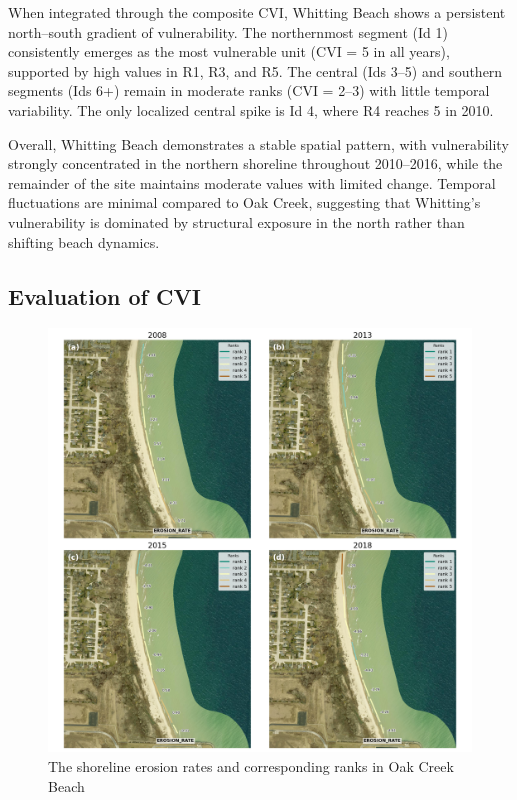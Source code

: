When integrated through the composite CVI, Whitting Beach shows a persistent
north–south gradient of vulnerability. The northernmost segment (Id 1)
consistently emerges as the most vulnerable unit (CVI = 5 in all years),
supported by high values in R1, R3, and R5. The central (Ids 3–5) and southern
segments (Ids 6+) remain in moderate ranks (CVI = 2–3) with little temporal
variability. The only localized central spike is Id 4, where R4 reaches 5 in
2010.

Overall, Whitting Beach demonstrates a stable spatial pattern, with
vulnerability strongly concentrated in the northern shoreline throughout
2010–2016, while the remainder of the site maintains moderate values with
limited change. Temporal fluctuations are minimal compared to Oak Creek,
suggesting that Whitting’s vulnerability is dominated by structural exposure in
the north rather than shifting beach dynamics.

\subsection{Evaluation of CVI}
\label{Evaluation of CVI}

\begin{figure}[htbp]
  \centering
  \includegraphics[width=1\textwidth]{chapter5/resources/site1_erosion.png}
  \caption{The shoreline erosion rates and corresponding ranks in Oak Creek Beach}
  \label{fig:s1_erosion}
\end{figure}

